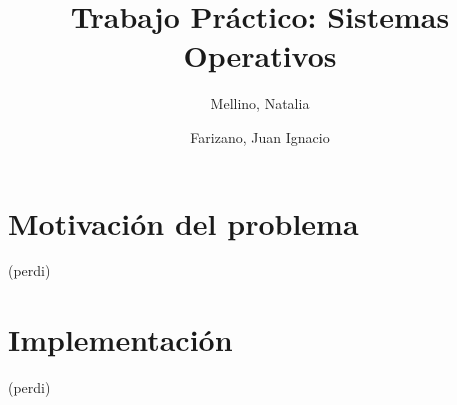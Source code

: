 \documentclass[11pt]{article}
\title{Trabajo Práctico: Sistemas Operativos}
\author{Mellino, Natalia \and Farizano, Juan Ignacio}
\date{}
\begin{document}
\maketitle

\section*{Motivación del problema}
(perdi)

\section*{Implementación}
(perdi)
\end{document}
